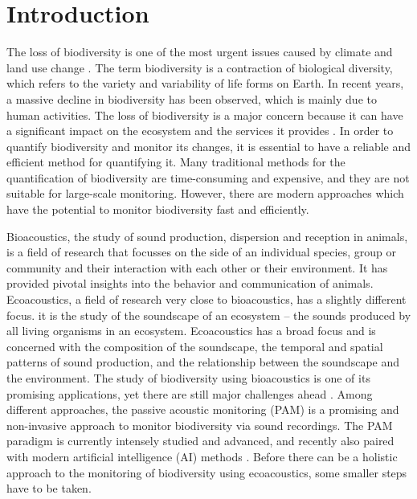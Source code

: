 

\section{Introduction}
\label{introduction}

The loss of biodiversity is one of the most urgent issues caused by climate and land use change \autocite{cardinaleBiodiversityLossIts2012}. 
The term biodiversity is a contraction of biological diversity, which refers to the variety and variability of life forms on Earth.
In recent years, a massive decline in biodiversity has been observed, which is mainly due to human activities. 
The loss of biodiversity is a major concern because it can have a significant impact on the ecosystem and the services it provides \autocite{brondizioGlobalAssessmentReport2019}. 
In order to quantify biodiversity and monitor its changes, it is essential to have a reliable and efficient method for quantifying it.
Many traditional methods for the quantification of biodiversity are time-consuming and expensive, and they are not suitable for large-scale monitoring.
However, there are modern approaches which have the potential to monitor biodiversity fast and efficiently.

Bioacoustics, the study of sound production, dispersion and reception in animals, is a
field of research that focusses on the side of an individual species, group or community
and their interaction with each other or their environment. 
It has provided pivotal insights into the behavior and communication of animals.
Ecoacoustics, a field of research very close to bioacoustics, has a slightly different focus.
it is the study of the soundscape of an ecosystem -- the sounds produced by all living organisms in an ecosystem.
Ecoacoustics has a broad focus and is concerned with the composition of the soundscape, the temporal and spatial patterns of sound production, 
and the relationship between the soundscape and the environment. The study of biodiversity using bioacoustics
is one of its promising applications, yet there are still major challenges ahead \autocite{scarpelliMultiIndexEcoacousticsAnalysis2021}.
Among different approaches, the passive acoustic monitoring (PAM) is a promising and non-invasive approach to monitor biodiversity via sound recordings.
The PAM paradigm is currently intensely studied and advanced, and recently also paired with modern artificial intelligence (AI) methods \autocite{dengHarnessingPowerSound2023}.
Before there can be a holistic approach to the monitoring of biodiversity using ecoacoustics, some smaller steps have to be taken.

